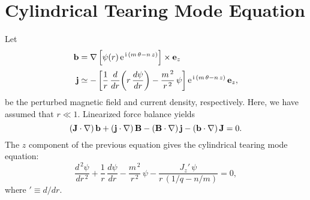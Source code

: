 \documentclass[notitlepage,12pt]{article}
\begin{document}
\section{Cylindrical Tearing Mode Equation}
Let 
\begin{align}
{\bf b} &= \nabla\left[\psi(r)\,{\rm e}^{\,{\rm i}\,(m\,\theta-n\,z)}\right]\times{\bf e}_z\,\\[0.5ex]
{\bf j} &\simeq -\left[\frac{1}{r}\,\frac{d}{dr}\!\left(r\,\frac{d\psi}{dr}\right)-\frac{m^{\,2}}{r^{\,2}}\,\psi\right]{\rm e}^{\,{\rm i}\,(m\,\theta-n\,z)}\,{\bf e}_z,
\end{align}
be the perturbed magnetic field and current density, respectively. Here, we have assumed that  $r\ll 1$. Linearized  force balance
yields
\begin{equation}
({\bf J}\cdot\nabla)\,{\bf b} +({\bf j}\cdot\nabla)\,{\bf B} -({\bf B}\cdot\nabla)\,{\bf j} - ({\bf b}\cdot\nabla)\,{\bf J} = 0.
\end{equation}
The $z$ component of the previous equation gives the cylindrical tearing mode equation:
\begin{equation}
\frac{d^{\,2}\psi}{dr^{\,2}}+\frac{1}{r}\,\frac{d\psi}{dr} - \frac{m^{\,2}}{r^{\,2}}\,\psi - \frac{J_z'\,\psi}{r\,(1/q-n/m)} = 0,
\end{equation}
where $'\equiv d/dr$.
\end{document}
